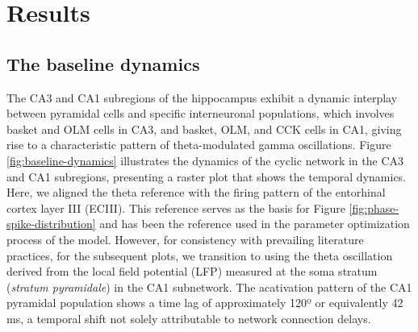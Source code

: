 \documentclass[../main.tex]{subfiles}
\begin{document}
\section{Results}
\subsection{The baseline dynamics}
The CA3 and CA1 subregions of the hippocampus exhibit a dynamic interplay between pyramidal cells and specific interneuronal populations, which involves basket and OLM cells in CA3, and basket, OLM, and CCK cells in CA1, giving rise to a characteristic pattern of theta-modulated gamma oscillations.
Figure \ref{fig:baseline-dynamics} illustrates the dynamics of the cyclic network in the CA3 and CA1 subregions, presenting a raster plot that shows the temporal dynamics.
Here, we aligned the theta reference with the firing pattern of the entorhinal cortex layer III (ECIII).
This reference serves as the basis for Figure \ref{fig:phase-spike-distribution} and has been the reference used in the parameter optimization process of the model.
However, for consistency with prevailing literature practices, for the subsequent plots, we transition to using the theta oscillation derived from the local field potential (LFP) measured at the soma stratum (\textit{stratum pyramidale}) in the CA1 subnetwork.
The acativation pattern of the CA1 pyramidal population shows a time lag of approximately 120º or equivalently 42 ms, a temporal shift not solely attributable to network connection delays.
\end{document}
